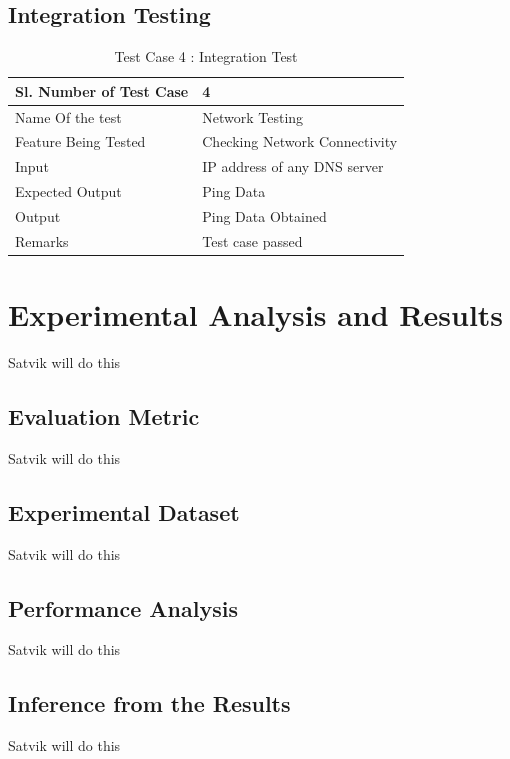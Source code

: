 \documentclass[12pt]{report}
\begin{document}
\section{Integration Testing}

\begin{table}
    \begin{tabular}{|l|l|}
    \hline
    Sl. Number of Test Case & 4                             \\ \hline
    Name Of the test        & Network Testing               \\ \hline
    Feature Being Tested    & Checking Network Connectivity \\ \hline
    Input                   & IP address of any DNS server  \\ \hline
    Expected Output         & Ping Data                     \\ \hline
    Output                  & Ping Data Obtained            \\ \hline
    Remarks                 & Test case passed              \\ \hline
    \end{tabular}
    \caption {Test Case 4 : Integration Test}
\end{table}


\pagestyle{fancy}
\chead{}
\rfoot{\small{\thepage}}
\renewcommand{\headrulewidth}{0.4pt}
\renewcommand{\footrulewidth}{0.4pt}
\chapter{Experimental Analysis and Results}
Satvik will do this
\section{Evaluation Metric}
Satvik will do this
\section{Experimental Dataset}
Satvik will do this
\section{Performance Analysis}
Satvik will do this
\section{Inference from the Results}
Satvik will do this
\end{document}
